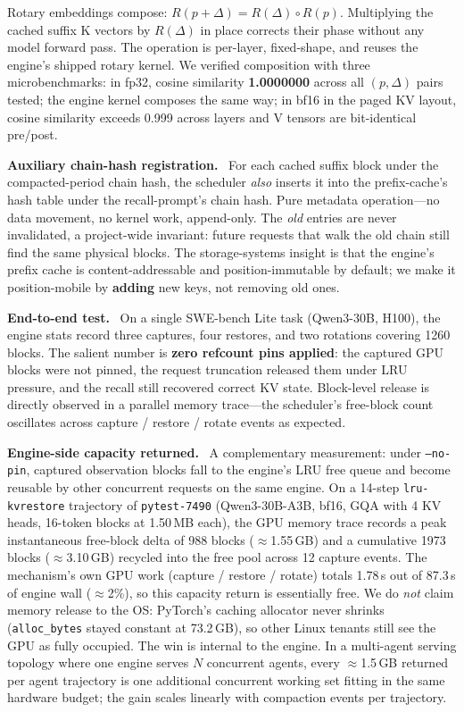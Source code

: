 \documentclass[letterpaper,twocolumn,10pt]{article}
\newcommand{\para}[1]{\smallskip\noindent\textbf{#1.}\ }
\begin{document}
Rotary embeddings compose: $R(p+\Delta) = R(\Delta) \circ R(p)$.
Multiplying the cached suffix K vectors by $R(\Delta)$ in place
corrects their phase without any model forward pass. The
operation is per-layer, fixed-shape, and reuses the engine's
shipped rotary kernel. We verified composition with three
microbenchmarks: in fp32, cosine similarity \textbf{1.0000000}
across all $(p, \Delta)$ pairs tested; the engine kernel
composes the same way; in bf16 in the paged KV layout, cosine
similarity exceeds 0.999 across layers and V tensors are
bit-identical pre/post.

\para{Auxiliary chain-hash registration} For each cached suffix
block under the compacted-period chain hash, the scheduler
\emph{also} inserts it into the prefix-cache's hash table under
the recall-prompt's chain hash. Pure metadata operation---no data
movement, no kernel work, append-only. The \emph{old} entries
are never invalidated, a project-wide invariant: future requests
that walk the old chain still find the same physical blocks. The
storage-systems insight is that the engine's prefix cache is
content-addressable and position-immutable by default; we make it
position-mobile by \textbf{adding} new keys, not removing old
ones.

\para{End-to-end test} On a single SWE-bench Lite task
(Qwen3-30B, H100), the engine stats record three captures, four
restores, and two rotations covering 1260 blocks. The salient
number is \textbf{zero refcount pins applied}: the captured GPU
blocks were not pinned, the request truncation released them
under LRU pressure, and the recall still recovered correct KV
state. Block-level release is directly observed in a parallel
memory trace---the scheduler's free-block count oscillates across
capture / restore / rotate events as expected.

\para{Engine-side capacity returned} A complementary measurement:
under \texttt{--no-pin}, captured observation blocks fall to the
engine's LRU free queue and become reusable by other concurrent
requests on the same engine. On a 14-step \texttt{lru-kvrestore}
trajectory of \texttt{pytest-7490} (Qwen3-30B-A3B, bf16, GQA with
4 KV heads, 16-token blocks at 1.50\,MB each), the GPU memory
trace records a peak instantaneous free-block delta of 988
blocks ($\approx$1.55\,GB) and a cumulative 1973 blocks
($\approx$3.10\,GB) recycled into the free pool across 12
capture events. The mechanism's own GPU work (capture / restore
/ rotate) totals 1.78\,s out of 87.3\,s of engine wall
($\approx$2\%), so this capacity return is essentially free. We
do \emph{not} claim memory release to the OS: PyTorch's caching
allocator never shrinks (\texttt{alloc\_bytes} stayed constant
at 73.2\,GB), so other Linux tenants still see the GPU as fully
occupied. The win is internal to the engine. In a multi-agent
serving topology where one engine serves $N$ concurrent agents,
every $\approx$1.5\,GB returned per agent trajectory is one
additional concurrent working set fitting in the same hardware
budget; the gain scales linearly with compaction events per
trajectory.
\end{document}
